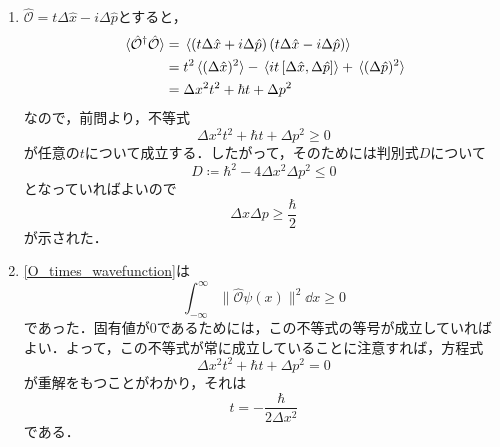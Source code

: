 \documentclass[a4paper,pdflatex,ja=standard]{bxjsarticle}
\begin{document}
\begin{enumerate}
  \item 
  $\hat{\mathcal{O}}=t\Delta \hat{x}-i\Delta \hat{p}$とすると，
  \begin{align}
    \ev*{\hat{\mathcal{O}}^{\dagger}\hat{\mathcal{O}}}
    &=
    \ev*{\left( t\Delta\hat{x}+i\Delta\hat{p} \right)\left( t\Delta\hat{x}-i\Delta\hat{p} \right)}
    \nonumber
    \\
    &=
    t^2\ev*{(\Delta\hat{x})^2}
    -
    \ev*{it\left[ \Delta\hat{x}, \Delta\hat{p} \right]}
    +
    \ev*{(\Delta\hat{p})^2}
    \nonumber
    \\
    &=
    \Delta x^2 t^2
    +
    \hbar t
    +
    \Delta p^2
  \end{align}
  なので，前問より，不等式
  \begin{equation}
    \Delta x^2 t^2
    +
    \hbar t
    +
    \Delta p^2
    \geq 
    0
  \end{equation}
  が任意の$t$について成立する．したがって，そのためには判別式$D$について
  \begin{equation}
    D
    \coloneqq
    \hbar^2 - 4 \Delta x^2 \Delta p^2
    \leq
    0
  \end{equation}
  となっていればよいので
  \begin{equation}
    \Delta x\Delta p\geq \frac{\hbar}{2}
  \end{equation}
  が示された．

  \item 
  \eqref{O_times_wavefunction}は
  \begin{equation}
    \int_{-\infty}^{\infty}\|\hat{\mathcal{O}}\psi(x)\|^2 \dd x \geq 0
  \end{equation}
  であった．固有値が$0$であるためには，この不等式の等号が成立していればよい．よって，この不等式が常に成立していることに注意すれば，方程式
  \begin{equation}
    \Delta x^2 t^2
    +
    \hbar t
    +
    \Delta p^2
    =
    0
  \end{equation}
  が重解をもつことがわかり，それは
  \begin{equation}
    t
    =
    -\frac{\hbar}{2\Delta x^2}
    \label{t_dup}
  \end{equation}
  である．


\end{enumerate}
\end{document}
